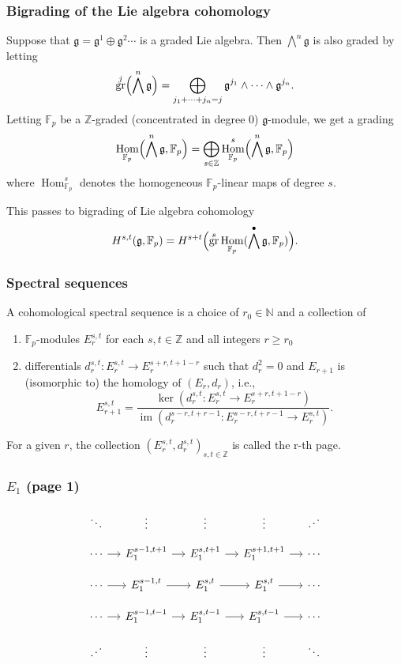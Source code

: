 \documentclass{beamer}
\newcommand*\N{\mathbb{N}}
\newcommand*\Z{\mathbb{Z}}
\newcommand*\F{\mathbb{F}}
\DeclareMathOperator{\im}{im}
\DeclareMathOperator{\Hom}{Hom} %
\DeclareMathOperator{\gr}{gr} %
\newcommand*{\lie}[1]{\mathfrak{#1}} %
\begin{document}

\begin{frame}
  \frametitle{Bigrading of the Lie algebra cohomology}

  Suppose that $\lie{g} = \lie{g}^{1} \oplus \lie{g}^{2} \dotsb$ is a graded Lie algebra. Then $\bigwedge^{n} \lie{g}$ is also graded by letting
  \[
    \gr^{j}\Bigl( \bigwedge^{n} \lie{g} \Bigr) = \bigoplus_{j_{1}+\dotsb+j_{n} = j} \lie{g}^{j_{1}} \wedge \dotsb \wedge \lie{g}^{j_{n}}.
  \]
  \pause
  Letting $\F_p$ be a $\Z$-graded (concentrated in degree $0$) $\lie{g}$-module, we get a grading
  \[
    \Hom_{\F_p}\Bigl( \bigwedge^n \lie{g}, \F_p \Bigr) = \bigoplus_{s \in \Z} \Hom_{\F_p}^s\Bigl( \bigwedge^n\lie{g},\F_p \Bigr)
  \]
  where $\Hom_{\F_p}^s$ denotes the homogeneous $\F_p$-linear maps of degree $s$.

  This passes to bigrading of Lie algebra cohomology
  \[
    H^{s,t}(\lie{g},\F_p) = H^{s+t}\Bigl( \gr^{s} \Hom_{\F_p}(\bigwedge^{\bullet} \lie{g},\F_p) \Bigr).
  \]
\end{frame}


\begin{frame}
  \frametitle{Spectral sequences}

  A cohomological spectral sequence is a choice of $r_0 \in \N$ and a collection of
  \begin{enumerate}[$\bullet$]
  \item $\F_{p}$-modules $E_{r}^{s,t}$ for each $s,t \in \Z$ and all integers $r \geq r_0$
  \item differentials $d_{r}^{s,t} \colon E_{r}^{s,t} \to E_{r}^{s+r,t+1-r}$ such that $d_{r}^{2} = 0$ and $E_{r+1}$ is (isomorphic to) the homology of $(E_r,d_r)$, i.e.,
    \[
      E_{r+1}^{s,t} = \frac{\ker(d_{r}^{s,t} \colon E_{r}^{s,t} \to E_{r}^{s+r,t+1-r})}{\im(d_{r}^{s-r,t+r-1} \colon E_{r}^{s-r,t+r-1} \to E_{r}^{s,t})}.
    \]
  \end{enumerate}
  For a given $r$, the collection $(E_{r}^{s,t},d_{r}^{s,t})_{s,t\in\Z}$ is called the r-th page.
\end{frame}


\begin{frame}[fragile]
  \frametitle{$E_1$ (page 1)}

  \[
    \begin{tikzcd}[column sep=small,row sep=small]
      \ddots & \vdots & \vdots & \vdots & \reflectbox{$\ddots$} \\
      \cdots \ar[r] & E_1^{s-1,t+1} \ar[r] & E_1^{s,t+1} \ar[r] & E_1^{s+1,t+1} \ar[r] & \cdots \\
      \cdots \ar[r] & E_1^{s-1,t} \ar[r] & E_1^{s,t} \ar[r] & E_1^{s,t} \ar[r] & \cdots \\
      \cdots \ar[r] & E_1^{s-1,t-1} \ar[r] & E_1^{s,t-1} \ar[r] & E_1^{s,t-1} \ar[r] & \cdots \\
      \reflectbox{$\ddots$} & \vdots & \vdots & \vdots & \ddots
    \end{tikzcd}
  \]
\end{frame}
\end{document}
